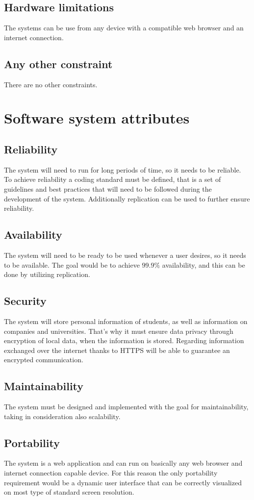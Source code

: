 \subsection{Hardware limitations}\label{subsec:hardware-limitations}
The systems can be use from any device with a compatible web browser and an internet connection.
\subsection{Any other constraint}\label{subsec:any-other-constraint}
There are no other constraints.


\section{Software system attributes}\label{sec:software-system-attributes}
\subsection{Reliability}\label{subsec:reliability}
The system will need to run for long periods of time, so it needs to be reliable.
To achieve reliability a coding standard must be defined, that is a set of guidelines and best practices that will need to be followed during the development of the system.
Additionally replication can be used to further ensure reliability.
\subsection{Availability}\label{subsec:availability}
The system will need to be ready to be used whenever a user desires, so it needs to be available.
The goal would be to achieve $99.9\%$ availability, and this can be done by utilizing replication.
\subsection{Security}\label{subsec:security}
The system will store personal information of students, as well as information on companies and universities.
That's why it must ensure data privacy through encryption of local data, when the information is stored.
Regarding information exchanged over the internet thanks to HTTPS will be able to guarantee an encrypted communication.
\subsection{Maintainability}\label{subsec:maintainability}
The system must be designed and implemented with the goal for maintainability, taking in consideration also scalability.
\subsection{Portability}\label{subsec:portability}
The system is a web application and can run on basically any web browser and internet connection capable device.
For this reason the only portability requirement would be a dynamic user interface that can be correctly visualized on most type of standard screen resolution.